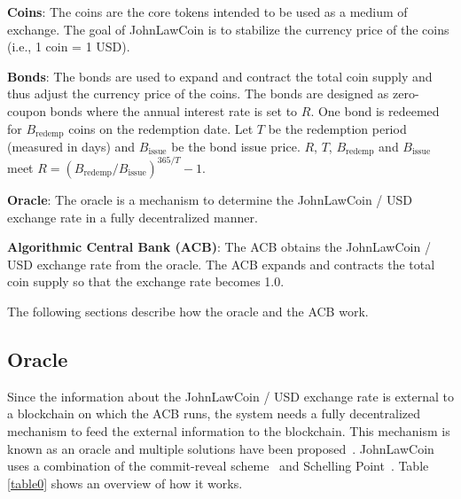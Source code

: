 \documentclass[dvipdfmx,a4paper]{article}
\begin{document}
\begin{description}
\item{\textbf{Coins}}: The coins are the core tokens intended to be used as a medium of exchange. The goal of JohnLawCoin is to stabilize the currency price of the coins (i.e., 1 coin = 1 USD).
\item{\textbf{Bonds}}: The bonds are used to expand and contract the total coin supply and thus adjust the currency price of the coins. The bonds are designed as zero-coupon bonds where the annual interest rate is set to $R$. One bond is redeemed for $B_{\mathrm{redemp}}$ coins on the redemption date. Let $T$ be the redemption period (measured in days) and $B_{\mathrm{issue}}$ be the bond issue price. $R$, $T$, $B_{\mathrm{redemp}}$ and $B_{\mathrm{issue}}$ meet $R=(B_{\mathrm{redemp}}/B_{\mathrm{issue}})^{365/T}-1$.
\item{\textbf{Oracle}}: The oracle is a mechanism to determine the JohnLawCoin / USD exchange rate in a fully decentralized manner.
\item{\textbf{Algorithmic Central Bank (ACB)}}: The ACB obtains the JohnLawCoin / USD exchange rate from the oracle. The ACB expands and contracts the total coin supply so that the exchange rate becomes 1.0.
\end{description}

The following sections describe how the oracle and the ACB work.

\subsection{Oracle}

Since the information about the JohnLawCoin / USD exchange rate is external to a blockchain on which the ACB runs, the system needs a fully decentralized mechanism to feed the external information to the blockchain. This mechanism is known as an oracle and multiple solutions have been proposed~\cite{chainlink,adler2018astraea}. JohnLawCoin uses a combination of the commit-reveal scheme~\cite{wohrer2018design} and Schelling Point~\cite{shellingpoint}. Table \ref{table0} shows an overview of how it works.
\end{document}
